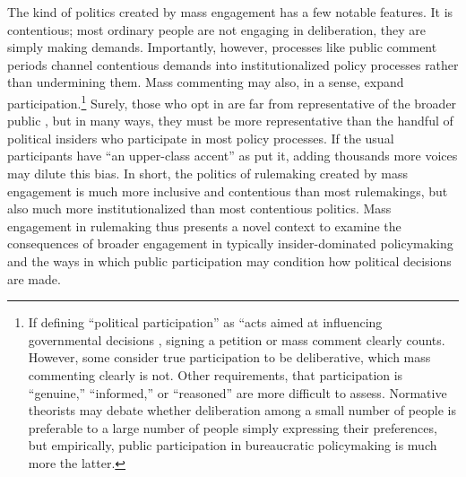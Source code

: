 The kind of politics created by mass engagement has a few notable features. It is contentious; most ordinary people are not engaging in deliberation, they are simply making demands. Importantly, however, processes like public comment periods channel contentious demands into institutionalized policy processes rather than undermining them. %
Mass commenting may also, in a sense, expand participation.\footnote{
If defining ``political participation'' as ``acts aimed at influencing governmental decisions \citep[p. 2]{Verba1987}, signing a petition or mass comment clearly counts. However, some consider true participation to be deliberative, which mass commenting clearly is not. Other requirements, that participation is ``genuine,'' ``informed,'' or ``reasoned'' are more difficult to assess. %
Normative theorists may debate whether deliberation among a small number of people is preferable to a large number of people simply expressing their preferences, but empirically, public participation in bureaucratic policymaking is much more the latter.
} 
Surely, those who opt in are far from representative of the broader public \citep{Verba1987}, but in many ways, they must be more representative than the handful of political insiders who participate in most policy processes. If the usual participants have ``an upper-class accent'' as \citet{Schattschneider1942} put it, adding thousands more voices may dilute this bias. In short, the politics of rulemaking created by mass engagement is much more inclusive and contentious than most rulemakings, but also much more institutionalized than most contentious politics. Mass engagement in rulemaking thus presents a novel context to examine the consequences of broader engagement in typically insider-dominated policymaking and the ways in which public participation may condition how political decisions are made. 


















